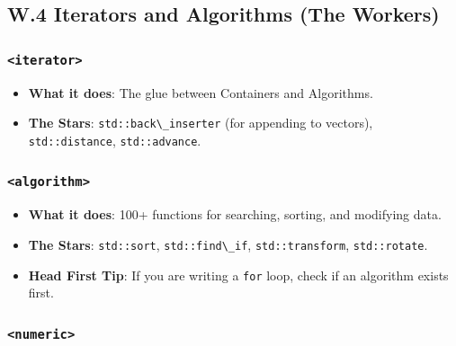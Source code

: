 \hypertarget{w.4-iterators-and-algorithms-the-workers}{%
\subsection{W.4 Iterators and Algorithms (The
Workers)}\label{w.4-iterators-and-algorithms-the-workers}}

\hypertarget{iterator}{%
\subsubsection{\texorpdfstring{\texttt{\textless{}iterator\textgreater{}}}{\textless iterator\textgreater{}}}\label{iterator}}

\begin{itemize}
\tightlist
\item
  \textbf{What it does}: The glue between Containers and Algorithms.
\item
  \textbf{The Stars}: \passthrough{\lstinline!std::back\_inserter!} (for
  appending to vectors), \passthrough{\lstinline!std::distance!},
  \passthrough{\lstinline!std::advance!}.
\end{itemize}

\hypertarget{algorithm}{%
\subsubsection{\texorpdfstring{\texttt{\textless{}algorithm\textgreater{}}}{\textless algorithm\textgreater{}}}\label{algorithm}}

\begin{itemize}
\tightlist
\item
  \textbf{What it does}: 100+ functions for searching, sorting, and
  modifying data.
\item
  \textbf{The Stars}: \passthrough{\lstinline!std::sort!},
  \passthrough{\lstinline!std::find\_if!},
  \passthrough{\lstinline!std::transform!},
  \passthrough{\lstinline!std::rotate!}.
\item
  \textbf{Head First Tip}: If you are writing a
  \passthrough{\lstinline!for!} loop, check if an algorithm exists
  first.
\end{itemize}

\hypertarget{numeric}{%
\subsubsection{\texorpdfstring{\texttt{\textless{}numeric\textgreater{}}}{\textless numeric\textgreater{}}}\label{numeric}}

